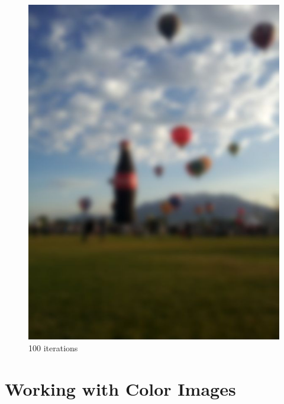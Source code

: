 \begin{figure}[ht]
\begin{minipage}[b]{0.45\linewidth}
\includegraphics[width=\textwidth]{baloon_resized_color_100.jpg}
\caption*{100 iterations}
\end{minipage}
\end{figure}

\section*{Working with Color Images}

